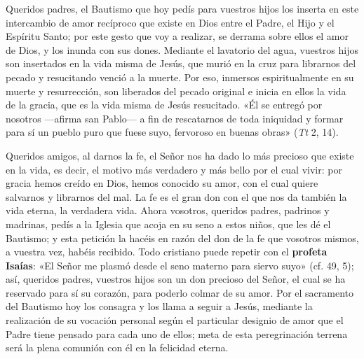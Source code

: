 \documentclass[]{article}
\begin{document}
Queridos padres, el Bautismo que hoy pedís para vuestros hijos los
inserta en este intercambio de amor recíproco que existe en Dios entre
el Padre, el Hijo y el Espíritu Santo; por este gesto que voy a
realizar, se derrama sobre ellos el amor de Dios, y los inunda con sus
dones. Mediante el lavatorio del agua, vuestros hijos son insertados en
la vida misma de Jesús, que murió en la cruz para librarnos del pecado y
resucitando venció a la muerte. Por eso, inmersos espiritualmente en su
muerte y resurrección, son liberados del pecado original e inicia en
ellos la vida de la gracia, que es la vida misma de Jesús resucitado.
«Él se entregó por nosotros ---afirma san Pablo--- a fin de rescatarnos
de toda iniquidad y formar para sí un pueblo puro que fuese suyo,
fervoroso en buenas obras» (\emph{Tt} 2, 14).

Queridos amigos, al darnos la fe, el Señor nos ha dado lo más precioso
que existe en la vida, es decir, el motivo más verdadero y más bello por
el cual vivir: por gracia hemos creído en Dios, hemos conocido su amor,
con el cual quiere salvarnos y librarnos del mal. La fe es el gran don
con el que nos da también la vida eterna, la verdadera vida. Ahora
vosotros, queridos padres, padrinos y madrinas, pedís a la Iglesia que
acoja en su seno a estos niños, que les dé el Bautismo; y esta petición
la hacéis en razón del don de la fe que vosotros mismos, a vuestra vez,
habéis recibido. Todo cristiano puede repetir con el \textbf{profeta
Isaías}: «El Señor me plasmó desde el seno materno para siervo suyo»
(cf. 49, 5); así, queridos padres, vuestros hijos son un don precioso
del Señor, el cual se ha reservado para sí su corazón, para poderlo
colmar de su amor. Por el sacramento del Bautismo hoy los consagra y los
llama a seguir a Jesús, mediante la realización de su vocación personal
según el particular designio de amor que el Padre tiene pensado para
cada uno de ellos; meta de esta peregrinación terrena será la plena
comunión con él en la felicidad eterna.
\end{document}

